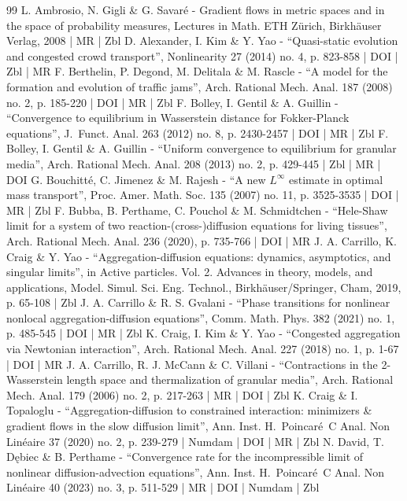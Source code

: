 \begin{thebibliography}{99}
L. Ambrosio, N. Gigli \& G. Savaré - Gradient flows in metric spaces and in the space of probability measures, Lectures in Math. ETH Zürich, Birkhäuser Verlag, 2008 | MR | Zbl
D. Alexander, I. Kim \& Y. Yao - “Quasi-static evolution and congested crowd transport”, Nonlinearity 27 (2014) no. 4, p. 823-858 | DOI | Zbl | MR
F. Berthelin, P. Degond, M. Delitala \& M. Rascle - “A model for the formation and evolution of traffic jams”, Arch. Rational Mech. Anal. 187 (2008) no. 2, p. 185-220 | DOI | MR | Zbl
F. Bolley, I. Gentil \& A. Guillin - “Convergence to equilibrium in Wasserstein distance for Fokker-Planck equations”, J. Funct. Anal. 263 (2012) no. 8, p. 2430-2457 | DOI | MR | Zbl
F. Bolley, I. Gentil \& A. Guillin - “Uniform convergence to equilibrium for granular media”, Arch. Rational Mech. Anal. 208 (2013) no. 2, p. 429-445 | Zbl | MR | DOI
G. Bouchitté, C. Jimenez \& M. Rajesh - “A new $L^\infty $ estimate in optimal mass transport”, Proc. Amer. Math. Soc. 135 (2007) no. 11, p. 3525-3535 | DOI | MR | Zbl
F. Bubba, B. Perthame, C. Pouchol \& M. Schmidtchen - “Hele-Shaw limit for a system of two reaction-(cross-)diffusion equations for living tissues”, Arch. Rational Mech. Anal. 236 (2020), p. 735-766 | DOI | MR
J. A. Carrillo, K. Craig \& Y. Yao - “Aggregation-diffusion equations: dynamics, asymptotics, and singular limits”, in Active particles. Vol. 2. Advances in theory, models, and applications, Model. Simul. Sci. Eng. Technol., Birkhäuser/Springer, Cham, 2019, p. 65-108 | Zbl
J. A. Carrillo \& R. S. Gvalani - “Phase transitions for nonlinear nonlocal aggregation-diffusion equations”, Comm. Math. Phys. 382 (2021) no. 1, p. 485-545 | DOI | MR | Zbl
K. Craig, I. Kim \& Y. Yao - “Congested aggregation via Newtonian interaction”, Arch. Rational Mech. Anal. 227 (2018) no. 1, p. 1-67 | DOI | MR
J. A. Carrillo, R. J. McCann \& C. Villani - “Contractions in the 2-Wasserstein length space and thermalization of granular media”, Arch. Rational Mech. Anal. 179 (2006) no. 2, p. 217-263 | MR | DOI | Zbl
K. Craig \& I. Topaloglu - “Aggregation-diffusion to constrained interaction: minimizers \& gradient flows in the slow diffusion limit”, Ann. Inst. H. Poincaré C Anal. Non Linéaire 37 (2020) no. 2, p. 239-279 | Numdam | DOI | MR | Zbl
N. David, T. Dębiec \& B. Perthame - “Convergence rate for the incompressible limit of nonlinear diffusion-advection equations”, Ann. Inst. H. Poincaré C Anal. Non Linéaire 40 (2023) no. 3, p. 511-529 | MR | DOI | Numdam | Zbl

\end{thebibliography}
